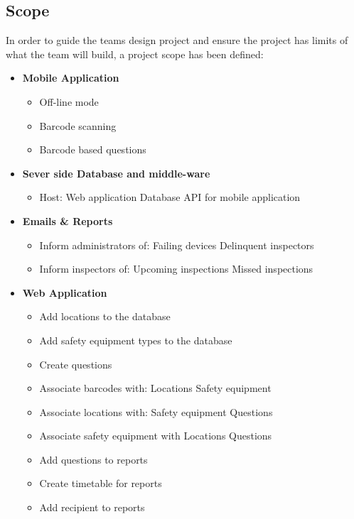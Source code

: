 \documentclass[Letter,11pt]{article}
\begin{document}
	\subsection{Scope}\label{scope}
	In order to guide the teams design project and ensure the project has limits of what the team will build, a project scope has been defined:
	\\
	\begin{minipage}[t]{0.5\textwidth}
		\begin{itemize}
			\item \textbf{Mobile Application}
			\begin{itemize}
				\item Off-line mode
				\item Barcode scanning
				\item Barcode based questions
			\end{itemize}
			\item \textbf{Sever side Database and middle-ware}
			\begin{itemize}
				\item Host:
					\subitem Web application
					\subitem Database API for mobile application
			\end{itemize}
			\item\textbf{ Emails \& Reports}
			\begin{itemize}
				\item Inform administrators of:
					\subitem Failing devices
					\subitem Delinquent inspectors
				\item Inform inspectors of:
					\subitem Upcoming inspections
					\subitem Missed inspections
			\end{itemize}
		\end{itemize}
	\end{minipage}
	\begin{minipage}[t]{0.5\textwidth}
		\begin{itemize}
			\item \textbf{Web Application}
				\begin{itemize}
					\item Add locations to the database
					\item Add safety equipment types to the database
					\item Create questions
					\item Associate barcodes with:
						\subitem Locations
						\subitem Safety equipment
					\item Associate locations with:
						\subitem Safety equipment
						\subitem Questions
					\item Associate safety equipment with
						\subitem Locations
						\subitem Questions
					\item Add questions to reports
					\item Create timetable for reports
					\item Add recipient to reports
				\end{itemize}
		\end{itemize}
	\end{minipage}
		
\end{document}
